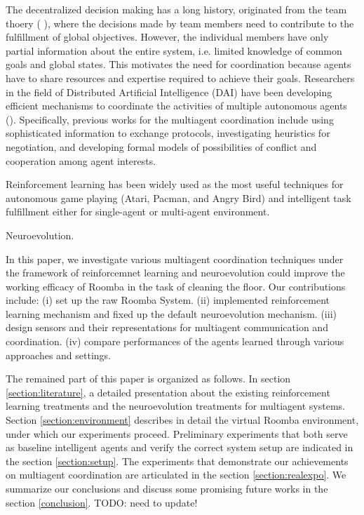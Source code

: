 \documentclass[conference]{IEEEtran}
\begin{document}
The decentralized decision making has a long history, originated from the team
thoery (\hspace*{-0.85mm} \cite{marschak1955elements, radner1962team,
    radner1959application, ho1972team, tsitsiklis1985complexity}),
where the decisions made by team members need to contribute to the fulfillment
of global objectives. However, the individual members have only partial
information about the entire system, i.e. limited knowledge of common goals
and global states. This motivates the need for coordination because agents
have to share resources and expertise required to achieve their goals.
Researchers in the field of Distributed Artificial Intelligence (DAI) have
been developing efficient mechanisms to coordinate the activities of multiple
autonomous agents (\hspace*{-1.7mm}\cite{weiss1999multiagent, huhns2012distributed}). 
Specifically, previous works for the multiagent coordination 
include using sophisticated information to exchange protocols, investigating
heuristics for negotiation, and developing formal models of possibilities of
conflict and cooperation among agent interests. 

Reinforcement learning has been widely used as the most useful techniques for
autonomous game playing (Atari, Pacman, and Angry Bird) and intelligent task
fulfillment either for single-agent or multi-agent environment. 

Neuroevolution.

In this paper, we
investigate various multiagent coordination techniques under the framework of
reinforcemnet learning and neuroevolution could improve the working efficacy
of Roomba in the task of cleaning the floor. 
Our contributions include: 
(i) set up the raw Roomba System. 
(ii) implemented reinforcement learning mechanism and fixed up the default
neuroevolution mechanism. 
(iii) design sensors and their representations for multiagent
communication and coordination. 
(iv) compare performances of the agents learned through various approaches and
settings.

The remained part of this paper is organized as follows. 
In section \ref{section:literature}, a detailed presentation about the
existing  reinforcement learning treatments and the neuroevolution treatments
for multiagent systems.  
Section \ref{section:environment} describes in detail the virtual Roomba
environment, under which our experiments proceed.  
Preliminary experiments that both serve as baseline intelligent agents and
verify the correct system setup are indicated in the section
\ref{section:setup}. 
The experiments that demonstrate our achievements on multiagent coordination
are articulated in the section \ref{section:realexpo}.
We summarize our conclusions and discuss some promising future works in the
section \ref{conclusion}. TODO: need to update!
\end{document}
